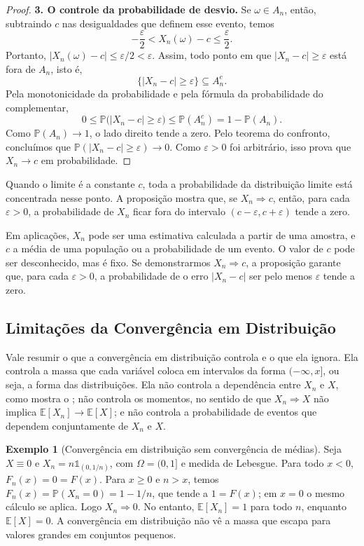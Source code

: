 \documentclass[12pt,portuguese]{article}
\theoremstyle{definition}
\newtheorem{example}[example]{Exemplo}
\theoremstyle{plainexercise}
\theoremstyle{starredexercise}
\theoremstyle{definition}
\begin{document}
\begin{proof}
\smallskip
\noindent\textbf{3. O controle da probabilidade de desvio.}
Se $\omega\in A_n$, então, subtraindo $c$ nas desigualdades que definem esse
evento, temos
\[
-\frac{\varepsilon}{2}<X_n(\omega)-c\leqslant\frac{\varepsilon}{2}.
\]
Portanto, $|X_n(\omega)-c|\leqslant\varepsilon/2<\varepsilon$.
Assim, todo ponto em que $|X_n-c|\geqslant\varepsilon$ está fora de $A_n$,
isto é,
\[
\{|X_n-c|\geqslant\varepsilon\}\subseteq A_n^c.
\]
Pela monotonicidade da probabilidade e pela fórmula da probabilidade do
complementar,
\[
0\leqslant\mathbb{P}\bigl(|X_n-c|\geqslant\varepsilon\bigr)
\leqslant\mathbb{P}(A_n^c)=1-\mathbb{P}(A_n).
\]
Como $\mathbb{P}(A_n)\to1$, o lado direito tende a zero. Pelo teorema do
confronto, concluímos que $\mathbb{P}(|X_n-c|\geqslant\varepsilon)\to0$.
Como $\varepsilon>0$ foi arbitrário, isso prova que $X_n\to c$ em
probabilidade.
\end{proof}

Quando o limite é a constante $c$, toda a probabilidade da distribuição
limite está concentrada nesse ponto. A proposição mostra que, se
$X_n\Rightarrow c$, então, para cada $\varepsilon>0$, a probabilidade de
$X_n$ ficar fora do intervalo $(c-\varepsilon,c+\varepsilon)$ tende a zero.

Em aplicações, $X_n$ pode ser uma estimativa calculada a partir de uma
amostra, e $c$ a média de uma população ou a probabilidade de um evento.
O valor de $c$ pode ser desconhecido, mas é fixo. Se demonstrarmos
$X_n\Rightarrow c$, a proposição garante que, para cada $\varepsilon>0$,
a probabilidade de o erro $|X_n-c|$ ser pelo menos $\varepsilon$ tende a zero.

\subsection{Limitações da Convergência em Distribuição}\label{subsec:dist-oque-nao}

Vale resumir o que a convergência em distribuição controla e o que ela ignora.
Ela controla a massa que cada variável coloca em intervalos da forma
$(-\infty,x]$, ou seja, a forma das distribuições. Ela não controla a
dependência entre $X_n$ e $X$, como mostra o ; não
controla os momentos, no sentido de que $X_n\Rightarrow X$ não implica
$\mathbb{E}[X_n]\to\mathbb{E}[X]$; e não controla a probabilidade de eventos que
dependem conjuntamente de $X_n$ e $X$.

\begin{example}[Convergência em distribuição sem convergência de médias]
\label{ex:dist-momentos}
Seja $X\equiv0$ e $X_n=n\mathds{1}_{(0,1/n)}$, com $\Omega=(0,1]$ e medida de
Lebesgue. Para todo $x<0$, $F_n(x)=0=F(x)$. Para $x\geqslant0$ e $n>x$,
temos $F_n(x)=\mathbb{P}(X_n=0)=1-1/n$, que tende a $1=F(x)$; em $x=0$ o mesmo
cálculo se aplica. Logo $X_n\Rightarrow0$. No entanto,
$\mathbb{E}[X_n]=1$ para todo $n$, enquanto $\mathbb{E}[X]=0$. A convergência em
distribuição não vê a massa que escapa para valores grandes em conjuntos
pequenos.
\end{example}
\end{document}
